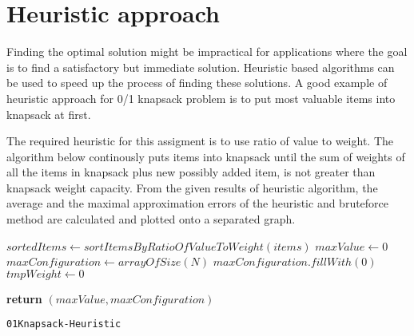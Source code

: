 \documentclass{article}
\begin{document}
		\section{Heuristic approach}
		Finding the optimal solution might be impractical for applications where the goal is to find a satisfactory but immediate solution. 
		Heuristic based algorithms can be used to speed up the process of finding these solutions.
		A good example of heuristic approach for 0/1 knapsack problem is to put most valuable items into knapsack at first.
		
		The required heuristic for this assigment is to use ratio of value to weight.
		The algorithm below continously puts items into knapsack until the sum of weights of all the items in knapsack plus new possibly added item, is not greater than knapsack weight capacity.
		From the given results of heuristic algorithm, the average and the maximal approximation errors of the heuristic and bruteforce method are calculated and plotted onto a separated graph.

		\begin{center}
			\begin{minipage}{1\linewidth} %
				\begin{algorithm}[H]
					\hrulefill
					\medskip

					$sortedItems \leftarrow sortItemsByRatioOfValueToWeight(items)$ \;
					$maxValue \leftarrow 0$ \;
					$maxConfiguration \leftarrow arrayOfSize(N)$ \;
					$maxConfiguration.fillWith(0)$ \;
					$tmpWeight \leftarrow 0$

					{\bf return} $(maxValue,maxConfiguration)$ \;
					\caption{\texttt{01Knapsack-Heuristic}} %
					\label{alg:knapsack-heuristic}   %
				\end{algorithm}
			\end{minipage}
		\end{center}
\end{document}
